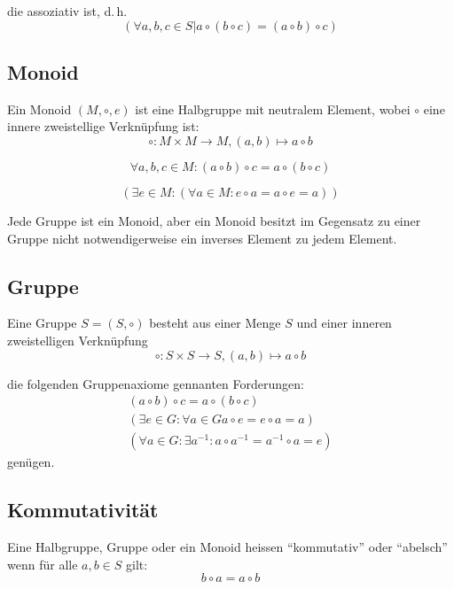 \documentclass[a4paper, ngerman, landscape, fleqn]{article}
\begin{document}
\begin{multicols*}{3}
die assoziativ ist, d.\,h.
\begin{equation*}
    (\forall a, b, c \in S | a \circ (b \circ c) = (a \circ b) \circ c)
\end{equation*}

\subsection*{Monoid}

Ein Monoid $(M, \circ, e)$ ist eine Halbgruppe mit neutralem Element, wobei $\circ$ eine innere zweistellige Verknüpfung ist:
\begin{equation*}
    \circ : M \times M \rightarrow M, (a, b) \mapsto a \circ b
\end{equation*}

\begin{equation*}
    \forall a, b, c \in M : (a \circ b) \circ c = a \circ (b \circ c)
\end{equation*}

\begin{equation*}
    (\exists e \in M : (\forall a \in M : e \circ a = a \circ e = a))
\end{equation*}

Jede Gruppe ist ein Monoid, aber ein Monoid besitzt im Gegensatz zu einer Gruppe nicht notwendigerweise ein inverses Element zu jedem Element.

\subsection*{Gruppe}
Eine Gruppe $S = (S, \circ)$ besteht aus einer Menge $S$ und einer inneren zweistelligen Verknüpfung
\begin{equation*}
    \circ : S \times S \rightarrow S, (a, b) \mapsto a \circ b
\end{equation*}

die folgenden Gruppenaxiome gennanten Forderungen:
\begin{align*}
    (a \circ b) \circ c = a \circ (b \circ c) \\
    (\exists e \in G : \forall a \in G a \circ e = e \circ a = a) \\
    (\forall a \in G : \exists a^{-1} : a \circ a^{-1} = a^{-1} \circ a = e)
\end{align*}
genügen.

\subsection*{Kommutativität}
Eine Halbgruppe, Gruppe oder ein Monoid heissen ``kommutativ'' oder ``abelsch'' wenn für alle $a, b \in S$ gilt:
\begin{equation*}
    b \circ a = a \circ b
\end{equation*}

\end{multicols*}
\end{document}

